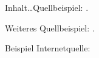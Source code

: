 
\setcounter{page}{1}

Inhalt\ldots Quellbeispiel: \cite[S.~2]{Plenk2019}.

Weiteres Quellbeispiel: \cite[S.~30ff.]{Siemens}.

Beispiel Internetquelle: \cite{Siemens2023}
